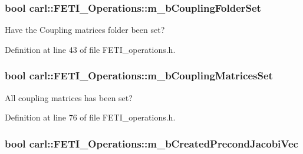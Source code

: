 \subsubsection[{m\+\_\+b\+Coupling\+Folder\+Set}]{\setlength{\rightskip}{0pt plus 5cm}bool carl\+::\+F\+E\+T\+I\+\_\+\+Operations\+::m\+\_\+b\+Coupling\+Folder\+Set\hspace{0.3cm}{\ttfamily [protected]}}\label{classcarl_1_1_f_e_t_i___operations_a99e19ecbfadee9c10545ba8ca0682f33}


Have the Coupling matrices folder been set? 



Definition at line 43 of file F\+E\+T\+I\+\_\+operations.\+h.

\hypertarget{classcarl_1_1_f_e_t_i___operations_a135e27fab9922c0343b09e0c98112c8c}{}
\subsubsection[{m\+\_\+b\+Coupling\+Matrices\+Set}]{\setlength{\rightskip}{0pt plus 5cm}bool carl\+::\+F\+E\+T\+I\+\_\+\+Operations\+::m\+\_\+b\+Coupling\+Matrices\+Set\hspace{0.3cm}{\ttfamily [protected]}}\label{classcarl_1_1_f_e_t_i___operations_a135e27fab9922c0343b09e0c98112c8c}


All coupling matrices has been set? 



Definition at line 76 of file F\+E\+T\+I\+\_\+operations.\+h.

\hypertarget{classcarl_1_1_f_e_t_i___operations_a49ca6d93078c918d738d64388b74f589}{}
\subsubsection[{m\+\_\+b\+Created\+Precond\+Jacobi\+Vec}]{\setlength{\rightskip}{0pt plus 5cm}bool carl\+::\+F\+E\+T\+I\+\_\+\+Operations\+::m\+\_\+b\+Created\+Precond\+Jacobi\+Vec\hspace{0.3cm}{\ttfamily [protected]}}\label{classcarl_1_1_f_e_t_i___operations_a49ca6d93078c918d738d64388b74f589}


